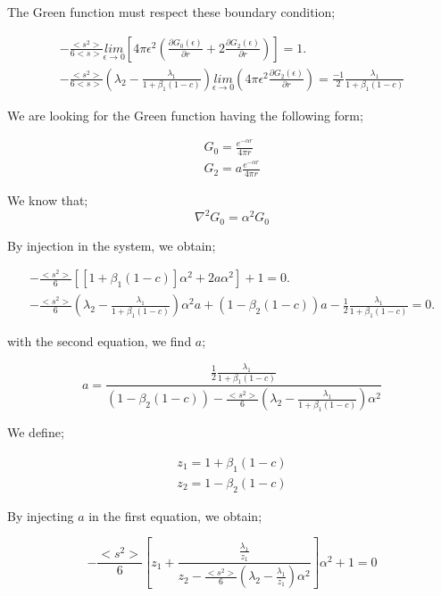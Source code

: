 \documentclass[preprint,12pt]{elsarticle}
\newcommand{\bl}{\big<}
\newcommand{\bg}{\big>}
\begin{document}
The Green function must respect these boundary condition;

\begin{align}
-\frac{\bl s^2 \bg}{6\bl s \bg} \underset{\epsilon \rightarrow 0}{lim} \left[4\pi \epsilon^2\left(\frac{\partial G_0(\epsilon)}{\partial r} + 2\frac{\partial G_2(\epsilon)}{\partial r} \right)\right]=1.\\
-\frac{\bl s^2 \bg}{6\bl s \bg}\left(\lambda_2 - \frac{\lambda_1}{1+\beta_1(1-c)}\right) \underset{\epsilon \rightarrow 0}{lim} \left(4\pi \epsilon^2 \frac{\partial G_2(\epsilon)}{\partial r}\right) = \frac{-1}{2}\frac{\lambda_1}{1+\beta_1(1-c)}
\end{align}

We are looking for the Green function having the following form;

\begin{align}
G_0 = \frac{e^{-\alpha r}}{4\pi r}\\
G_2 = a\frac{e^{-\alpha r}}{4\pi r}
\end{align}

We know that;
\begin{equation}
\nabla^2 G_0 = \alpha^2 G_0
\end{equation}

By injection in the system, we obtain;

\begin{align}
-\frac{\bl s^2 \bg}{6} \left[\left[1+\beta_1(1-c)\right]\alpha^2+ 2a\alpha^2\right] + 1 = 0. \\
-\frac{\bl s^2 \bg}{6}\left(\lambda_2 - \frac{\lambda_1}{1+\beta_1(1-c)}\right)\alpha^2a+ (1-\beta_2(1-c))a - \frac{1}{2} \frac{\lambda_1}{1+\beta_1(1-c)} = 0.
\end{align}

with the second equation, we find $a$;

\begin{equation}
a = \frac{\frac{1}{2}\frac{\lambda_1}{1+\beta_1(1-c)}}{(1-\beta_2(1-c)) - \frac{\bl s^2 \bg}{6} \left(\lambda_2 - \frac{\lambda_1}{1+\beta_1(1-c)}\right)\alpha^2 } 
\end{equation}

We define;

\begin{align}
z_1 = 1+\beta_1(1-c)\\
z_2 = 1- \beta_2(1-c)
\end{align}

By injecting $a$ in the first equation, we obtain;

\begin{equation}
-\frac{\bl s^2 \bg}{6} \left[z_1+\frac{\frac{\lambda_1}{z_1}}{{z_2 - \frac{\bl s^2 \bg}{6} \left(\lambda_2 - \frac{\lambda_1}{z_1}\right)\alpha^2 }}  \right]\alpha^2 + 1 = 0
\end{equation}
\end{document}
